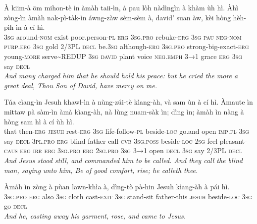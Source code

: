 \documentclass[11pt,a4paper]{article}
\begin{document}
\begin{exe}
\gll À kiim-à ōm mihon-tè ìn àmàh taii-ìn, à pau lòh nàdìngìn à khàm ùh hì. Àhì zòng-ìn àmàh nak-pì-tàk-ìn áwng-zàw sèm-sèm à, david' suan àw, kèi hòng hèh-pìh ìn à cí hì. \\
     \textsc{3sg} around-\textsc{nom} exist poor.person-\textsc{pl} \textsc{erg} \textsc{3sg}.\textsc{pro} rebuke-\textsc{erg} \textsc{3sg} \textsc{pau} \textsc{neg}-\textsc{nom} \textsc{purp}.\textsc{erg} \textsc{3sg} gold 2/3PL \textsc{decl} be.\textsc{3sg} although-\textsc{erg} \textsc{3sg}.\textsc{pro} strong-big-exact-\textsc{erg} young-\textsc{more} serve\textasciitilde{}REDUP \textsc{3sg} \textsc{david} plant voice \textsc{neg}.\textsc{emph} \textsc{3→1} grace \textsc{erg} \textsc{3sg} say \textsc{decl} \\
\glt \textcolor{kjvcolor}{\textit{And many charged him that he should hold his peace: but he cried the more a great deal, Thou Son of David, have mercy on me.}}

\gll Túa cìang-ìn Jesuh khawl-ìn à nùng-zúi-tè kìang-àh, và sam ùn à cí hì. Àmaute ìn mittaw pà sàm-ìn àmà kìang-àh, nà lùng nuam-sàk ìn; dìng ìn; àmàh ìn nàng à hòng sam hì à cí ùh hì. \\
     that then-\textsc{erg} \textsc{jesuh} rest-\textsc{erg} \textsc{3sg} life-follow-\textsc{pl} beside-\textsc{loc} go.and open \textsc{imp}.\textsc{pl} \textsc{3sg} say \textsc{decl} \textsc{3pl}.\textsc{pro} \textsc{erg} blind father call-\textsc{cvb} \textsc{3sg}.\textsc{poss} beside-\textsc{loc} \textsc{2sg} feel pleasant-\textsc{caus} \textsc{erg} \textsc{irr} \textsc{erg} \textsc{3sg}.\textsc{pro} \textsc{erg} \textsc{2sg}.\textsc{pro} \textsc{3sg} \textsc{3→1} open \textsc{decl} \textsc{3sg} say 2/3PL \textsc{decl} \\
\glt \textcolor{kjvcolor}{\textit{And Jesus stood still, and commanded him to be called. And they call the blind man, saying unto him, Be of good comfort, rise; he calleth thee.}}

\gll Àmàh ìn zòng à pùan lawn-khìa à, dìng-tò pà-hin Jesuh kìang-àh à pái hì. \\
     \textsc{3sg}.\textsc{pro} \textsc{erg} also \textsc{3sg} cloth cast-\textsc{exit} \textsc{3sg} stand-sit father-this \textsc{jesuh} beside-\textsc{loc} \textsc{3sg} go \textsc{decl} \\
\glt \textcolor{kjvcolor}{\textit{And he, casting away his garment, rose, and came to Jesus.}}


\end{exe}
\end{document}
